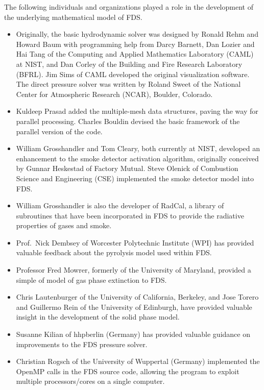 \documentclass[11pt]{book}
\begin{document}
\noindent The following individuals and organizations played a role in the development of the underlying mathematical model of FDS.
\begin{itemize}
\item Originally, the basic hydrodynamic solver was designed by Ronald Rehm
and Howard Baum with programming help from Darcy Barnett, Dan Lozier
and Hai Tang of the Computing and Applied Mathematics Laboratory
(CAML) at NIST, and Dan Corley of the Building and Fire Research
Laboratory (BFRL). Jim Sims of CAML developed the original
visualization software.  The direct pressure solver was written by
Roland Sweet of the National Center for Atmospheric Research (NCAR),
Boulder, Colorado.
\item Kuldeep Prasad added the multiple-mesh data
structures, paving the way for parallel processing.   Charles Bouldin
devised the basic framework of the parallel version of the code.
\item William Grosshandler and Tom Cleary, both currently at NIST, developed
an enhancement to the smoke detector activation algorithm, originally
conceived by Gunnar Heskestad of Factory Mutual. Steve
Olenick of Combustion Science and Engineering (CSE) implemented the
smoke detector model into FDS.
\item William Grosshandler is also the developer of RadCal, a library of
subroutines that have been incorporated in FDS to provide the
radiative properties of gases and smoke.
\item Prof.~Nick Dembsey of Worcester Polytechnic Institute (WPI) has provided valuable feedback about the pyrolysis model used within FDS.
\item Professor Fred Mowrer, formerly of the University of Maryland, provided a simple
of model of gas phase extinction to FDS.
\item Chris Lautenburger of the University of California, Berkeley, and Jose Torero and Guillermo Rein of the University of Edinburgh, have
provided valuable insight in the development of the solid phase model.
\item Susanne Kilian of hhpberlin (Germany) has provided valuable guidance on improvements to the FDS pressure solver.
\item Christian Rogsch of the University of Wuppertal (Germany) implemented the OpenMP calls in the FDS source code, allowing the program to
exploit multiple processors/cores on a single computer.
\end{itemize}
\end{document}
